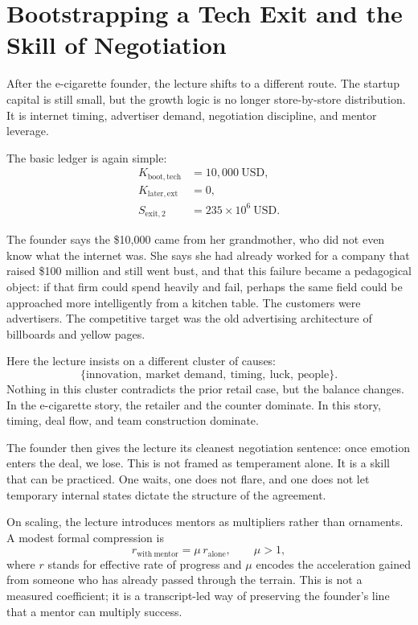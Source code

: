 \section{Bootstrapping a Tech Exit and the Skill of Negotiation}

After the e-cigarette founder, the lecture shifts to a different route. The startup capital is still small, but the growth logic is no longer store-by-store distribution. It is internet timing, advertiser demand, negotiation discipline, and mentor leverage.

The basic ledger is again simple:
\begin{align}
K_{\mathrm{boot,tech}} &= 10{,}000\ \mathrm{USD},\\
K_{\mathrm{later,ext}} &= 0,\\
S_{\mathrm{exit},2} &= 235\times 10^{6}\ \mathrm{USD}.
\end{align}

The founder says the \$10{,}000 came from her grandmother, who did not even know what the internet was. She says she had already worked for a company that raised \$100 million and still went bust, and that this failure became a pedagogical object: if that firm could spend heavily and fail, perhaps the same field could be approached more intelligently from a kitchen table. The customers were advertisers. The competitive target was the old advertising architecture of billboards and yellow pages.

Here the lecture insists on a different cluster of causes:
\[
\{\text{innovation},\ \text{market demand},\ \text{timing},\ \text{luck},\ \text{people}\}.
\]
Nothing in this cluster contradicts the prior retail case, but the balance changes. In the e-cigarette story, the retailer and the counter dominate. In this story, timing, deal flow, and team construction dominate.

The founder then gives the lecture its cleanest negotiation sentence: once emotion enters the deal, we lose. This is not framed as temperament alone. It is a skill that can be practiced. One waits, one does not flare, and one does not let temporary internal states dictate the structure of the agreement.

On scaling, the lecture introduces mentors as multipliers rather than ornaments. A modest formal compression is
\begin{equation}
r_{\mathrm{with\ mentor}}=\mu\,r_{\mathrm{alone}},\qquad \mu>1,
\end{equation}
where \(r\) stands for effective rate of progress and \(\mu\) encodes the acceleration gained from someone who has already passed through the terrain. This is not a measured coefficient; it is a transcript-led way of preserving the founder's line that a mentor can multiply success.

